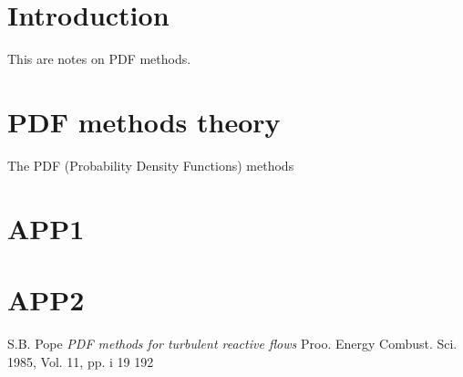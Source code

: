 \documentclass[10pt,twocolumn]{article}
\begin{document}

\tableofcontents

\vspace{10mm}

\setlength{\parindent}{0cm}

\section{Introduction}

This are notes on PDF methods.

\section{PDF methods theory}

The PDF (Probability Density Functions) methods























\appendix

\section{APP1} \label{app:A}

\section{APP2} \label{app:B}

\thebibliography{}

 S.B. Pope \textit{PDF methods for turbulent reactive flows}
Proo. Energy Combust. Sci. 1985, Vol. 11, pp. i 19 192 \label{bib:pope}
\end{document}

